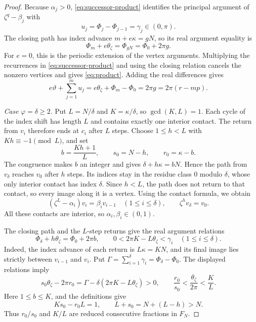 \documentclass[11pt,a4paper]{article}
\theoremstyle{definition}
\theoremstyle{remark}
\numberwithin{equation}{section}
\begin{document}
\begin{proof}
Because $\alpha_j>0$, \eqref{eq:successor-product} identifies the principal argument of $\zeta^q-\beta_j$ with
\[
 u_j=\Phi_j-\Phi_{j-1}=\gamma_j\in(0,\pi).
\]
The closing path has index advance $m+e\kappa=gN$, so its real argument equality is
\[
 \Phi_m+e\theta_\zeta=\Phi_{gN}=\Phi_0+2\pi g.
\]
For $e=0$, this is the periodic extension of the vertex arguments. Multiplying the recurrences in \eqref{eq:successor-product} and using the closing relation cancels the nonzero vertices and gives \eqref{eq:product}. Adding the real differences gives
\[
 e\vartheta+\sum_{j=1}^m u_j
 =e\theta_\zeta+\Phi_m-\Phi_0
 =2\pi g=2\pi(r-mp).
\]

\emph{Case $\varphi=\delta\ge2$.} Put $L=N/\delta$ and $K=\kappa/\delta$, so $\gcd(K,L)=1$. Each cycle of the index shift has length $L$ and contains exactly one interior contact. The return from $v_i$ therefore ends at $c_i$ after $L$ steps. Choose $1\le h<L$ with $Kh\equiv-1\pmod L$, and set
\[
 b=\frac{Kh+1}{L},\qquad s_0=N-h,\qquad r_0=\kappa-b.
\]
The congruence makes $b$ an integer and gives $\delta+h\kappa=bN$. Hence the path from $v_\delta$ reaches $v_0$ after $h$ steps. Its indices stay in the residue class $0$ modulo $\delta$, whose only interior contact has index $\delta$. Since $h<L$, the path does not return to that contact, so every image along it is a vertex. Using the contact formula, we obtain
\begin{equation}\label{eq:orbit-product}
 (\zeta^L-\alpha_i)v_i=\beta_i v_{i-1}\quad(1\le i\le\delta),
 \qquad \zeta^h v_\delta=v_0.
\end{equation}
All these contacts are interior, so $\alpha_i,\beta_i\in(0,1)$.

The closing path and the $L$-step returns give the real argument relations
\[
 \Phi_\delta+h\theta_\zeta=\Phi_0+2\pi b,
 \qquad 0<2\pi K-L\theta_\zeta<\gamma_i\quad(1\le i\le\delta).
\]
Indeed, the index advance of each return is $L\kappa=KN$, and its final image lies strictly between $v_{i-1}$ and $v_i$. Put $\Gamma=\sum_{i=1}^\delta\gamma_i=\Phi_\delta-\Phi_0$. The displayed relations imply
\[
 s_0\theta_\zeta-2\pi r_0
 =\Gamma-\delta(2\pi K-L\theta_\zeta)>0,
 \qquad \frac{r_0}{s_0}<\frac{\theta_\zeta}{2\pi}<\frac KL.
\]
Here $1\le b\le K$, and the definitions give
\[
 Ks_0-r_0L=1,\qquad L+s_0=N+(L-h)>N.
\]
Thus $r_0/s_0$ and $K/L$ are reduced consecutive fractions in $F_N$.


\end{proof}
\end{document}
